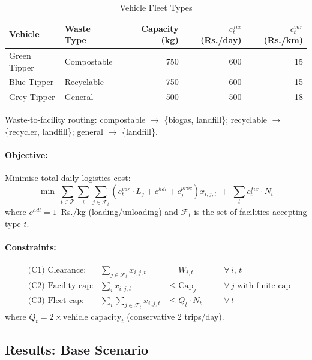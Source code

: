 \documentclass[11pt,a4paper]{article}
\begin{document}
\begin{table}[H]
\centering
\caption{Vehicle Fleet Types}
\begin{tabular}{llrrr}
\toprule
\textbf{Vehicle} & \textbf{Waste Type} & \textbf{Capacity (kg)} & \textbf{$c^{fix}_t$ (Rs./day)} & \textbf{$c^{var}_t$ (Rs./km)} \\ \midrule
Green Tipper & Compostable & 750 & 600 & 15 \\
Blue Tipper  & Recyclable  & 750 & 600 & 15 \\
Grey Tipper  & General     & 500 & 500 & 18 \\
\bottomrule
\end{tabular}
\end{table}

Waste-to-facility routing: compostable $\to$ \{biogas, landfill\}; recyclable $\to$ \{recycler, landfill\}; general $\to$ \{landfill\}.

\paragraph{Objective:} Minimise total daily logistics cost:
\begin{equation}
    \min \; \sum_{t \in \mathcal{T}} \sum_{i} \sum_{j \in \mathcal{F}_t} \left(c^{var}_t \cdot L_j + c^{hdl} + c^{proc}_j\right) x_{i,j,t} \;+\; \sum_t c^{fix}_t \cdot N_t
\end{equation}
where $c^{hdl} = 1$~Rs./kg (loading/unloading) and $\mathcal{F}_t$ is the set of facilities accepting type $t$.

\paragraph{Constraints:}
\begin{align}
    &\text{(C1) Clearance:} & \sum_{j \in \mathcal{F}_t} x_{i,j,t} &= W_{i,t} \quad &&\forall\, i,\, t \\
    &\text{(C2) Facility cap:} & \sum_i x_{i,j,t} &\le \text{Cap}_j \quad &&\forall\, j \text{ with finite cap} \\
    &\text{(C3) Fleet cap:} & \sum_i \sum_{j \in \mathcal{F}_t} x_{i,j,t} &\le Q_t \cdot N_t \quad &&\forall\, t
\end{align}
where $Q_t = 2 \times \text{vehicle capacity}_t$ (conservative 2 trips/day).

\subsection{Results: Base Scenario}
\end{document}
